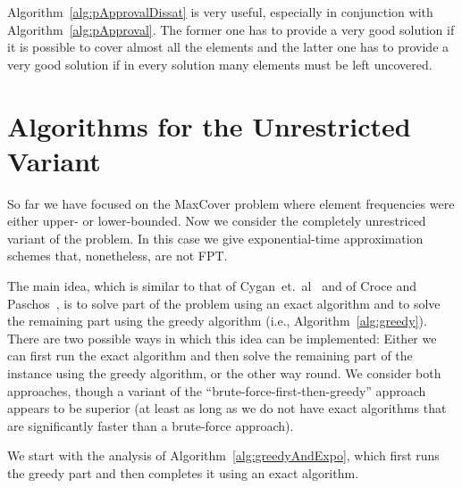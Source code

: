 \documentclass[11pt]{article}
\begin{document}
Algorithm~\ref{alg:pApprovalDissat} is very useful, especially in
conjunction with Algorithm~\ref{alg:pApproval}. The former one has to
provide a very good solution if it is possible to cover almost all the
elements and the latter one has to provide a very good solution if in
every solution many elements must be left uncovered.



\section{Algorithms for the Unrestricted Variant}
\label{sec:unrestricted}

So far we have focused on the MaxCover problem where element
frequencies were either upper- or lower-bounded. Now we consider the
completely unrestriced variant of the problem. In this case we give
exponential-time approximation schemes that, nonetheless, are not FPT.

The main idea, which is similar to that of
Cygan~et.~al~\cite{journals/ipl/CyganKW09} and of Croce and
Paschos~\cite{cro-pas:j:cover}, is to solve part of the problem using
an exact algorithm and to solve the remaining part using the greedy
algorithm (i.e., Algorithm~\ref{alg:greedy}). There are two possible
ways in which this idea can be implemented: Either we can first run
the exact algorithm and then solve the remaining part of the instance
using the greedy algorithm, or the other way round. We consider both
approaches, though a variant of the ``brute-force-first-then-greedy''
approach appears to be superior (at least as long as we do not have
exact algorithms that are significantly faster than a brute-force
approach).


We start with the analysis of Algorithm~\ref{alg:greedyAndExpo}, which
first runs the greedy part and then completes it using an exact
algorithm.
\end{document}
